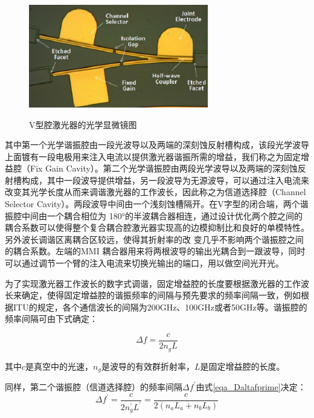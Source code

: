 \documentclass{ZJUthesis}
\begin{document}
\begin{figure}[htb]
  \centering
  \includegraphics[width=0.7\textwidth]{./Pictures/vccl.eps}\\
  \caption{V型腔激光器的光学显微镜图\cite{jin201116-VCCL}}\label{fig_vccl}
\end{figure}

其中第一个光学谐振腔由一段光波导以及两端的深刻蚀反射槽构成，该段光学波导上面镀有一段电极用来注入电流以提供激光器谐振所需的增益，我们称之为固定增益腔（Fix Gain Cavity）。第二个光学谐振腔由两段光学波导以及两端的深刻蚀反射槽构成，其中一段波导提供增益，另一段波导为无源波导，可以通过注入电流来改变其光学长度从而来调谐激光器的工作波长，因此称之为信道选择腔（Channel Selector Cavity）。两段波导中间由一个浅刻蚀槽隔开。在V字型的闭合端，两个谐振腔中间由一个耦合相位为 180°的半波耦合器相连，通过设计优化两个腔之间的耦合系数可以使得整个复合耦合腔激光器实现高的边模抑制比和良好的单模特性。另外波长调谐区离耦合区较远，使得其折射率的改
变几乎不影响两个谐振腔之间的耦合系数。左端的MMI 耦合器用来将两根波导的输出光耦合到一跟波导，同时可以通过调节一个臂的注入电流来切换光输出的端口，用以做空间光开光。

为了实现激光器工作波长的数字式调谐，固定增益腔的长度要根据激光器的工作波长来确定，使得固定增益腔的谐振频率的间隔与预先要求的频率间隔一致，例如根据ITU的规定，各个通信波长的间隔为200GHz、100GHz或者50GHz等。谐振腔的频率间隔可由下式确定：

\begin{equation}
  \Delta f = \frac{c}{2 n_g L}
\end{equation}

其中$c$是真空中的光速，$n_g$是波导的有效群折射率，$L$是固定增益腔的长度。

同样，第二个谐振腔（信道选择腔）的频率间隔$\Delta f ^\prime$由式\ref{eqa_Daltafprime}决定：
\begin{equation}\label{eqa_Daltafprime}
  \Delta f ^\prime= \frac{c}{2 n_g^\prime L^\prime} = \frac{c}{2 (n_a L_a + n_b L_b)}
\end{equation}
\end{document}
